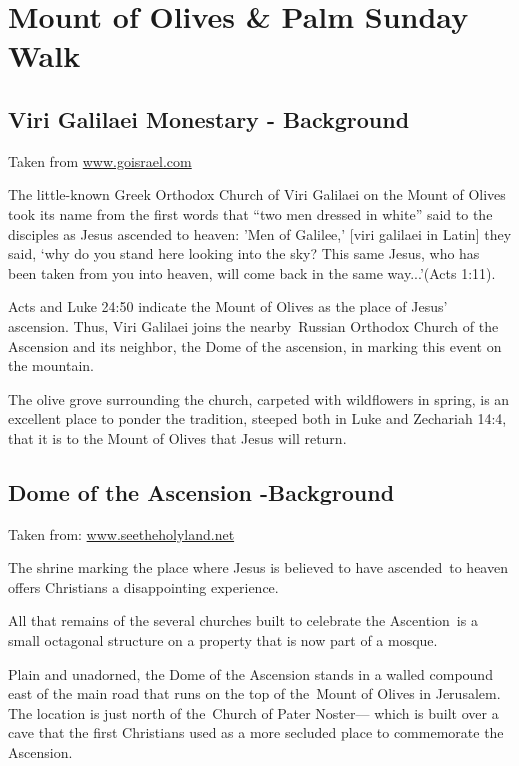 \documentclass[letterpaper]{report}
\begin{document}
\section{Mount of Olives \& Palm Sunday Walk}
\begin{multicols}{2}
\subsection{Viri Galilaei Monestary - Background}
Taken from \href{http://www.goisrael.com/Tourism_Eng/Tourist%20Information/Christian%20Themes/Details/Pages/Viri%20Galilaei.aspx}{
www.goisrael.com}

The little-known Greek Orthodox Church of Viri Galilaei on the Mount of Olives took its name from the first words that “two men dressed in white” said to the disciples as Jesus ascended to heaven: ’Men of Galilee,’ [viri galilaei in Latin] they said, ‘why do you stand here looking into the sky? This same Jesus, who has been taken from you into heaven, will come back in the same way...’(Acts 1:11). 

Acts and Luke 24:50 indicate the Mount of Olives as the place of Jesus’ ascension. Thus, Viri Galilaei joins the nearby Russian Orthodox Church of the Ascension and its neighbor, the Dome of the ascension, in marking this event on the mountain. 

The olive grove surrounding the church, carpeted with wildflowers in spring, is an excellent place to ponder the tradition, steeped both in Luke and Zechariah 14:4, that it is to the Mount of Olives that Jesus will return. 

\subsection{Dome of the Ascension -Background}

Taken from:
\href{http://www.seetheholyland.net/dome-of-the-ascension/}{www.seetheholyland.net}

The shrine marking the place where Jesus is believed to have ascended to heaven offers Christians a disappointing experience.

All that remains of the several churches built to celebrate the Ascention is a small octagonal structure on a property that is now part of a mosque.

Plain and unadorned, the Dome of the Ascension stands in a walled compound east of the main road that runs on the top of the Mount of Olives in Jerusalem. The location is just north of the Church of Pater Noster— which is built over a cave that the first Christians used as a more secluded place to commemorate the Ascension.


\end{multicols}
\end{document}
